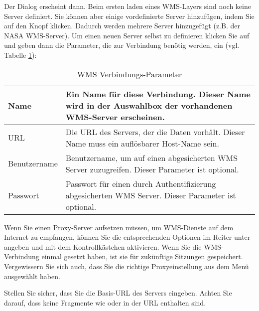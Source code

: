 Der Dialog  erscheint dann. Beim
ersten laden eines WMS-Layers sind noch keine Server definiert. Sie können
aber einige vordefinierte Server hinzufügen, indem Sie auf den Knopf
 klicken. Dadurch werden mehrere Server
hinzugefügt (z.B. der NASA WMS-Server). Um einen neuen Server selbst zu
definieren klicken Sie auf  und geben dann die Parameter, die zur
Verbindung benötig werden, ein (vgl. Tabelle \ref{tab:wms_connection_parms}):

\begin{table}[h]
\centering
\caption{WMS Verbindungs-Parameter}\label{tab:wms_connection_parms}\medskip
 \begin{tabular}{|l|p{11cm}|}
\hline Name & Ein Name für diese Verbindung. Dieser Name wird in der
Auswahlbox der vorhandenen WMS-Server erscheinen. \\
\hline URL \index{WMS!URL} & Die URL des Servers, der die Daten vorhält.
Dieser Name muss ein auflösbarer Host-Name sein.\\
\hline Benutzername \index{WMS!Authentifizierung} & Benutzername, um auf
einen abgesicherten WMS Server zuzugreifen. Dieser Parameter ist optional. \\
\hline Passwort & Passwort für einen durch Authentifizierung abgesicherten
WMS Server. Dieser Parameter ist optional. \\
\hline
\end{tabular}
\end{table}

Wenn Sie einen Proxy-Server aufsetzen müssen, um WMS-Dienste auf dem
Internet zu empfangen, können Sie die entsprechenden Optionen im Reiter
 unter  \arrow
{} angeben und mit dem
Kontrollkästchen  aktivieren. Wenn
Sie die WMS-Verbindung einmal gesetzt haben, ist sie für zukünftige Sitzungen
gespeichert. Vergewissern Sie sich auch, dass Sie die richtige
Proxyeinstellung aus dem  Menü ausgewählt haben.

\begin{Tip}[h]\caption{\textsc{WMS-Server-URLs}}
Stellen Sie sicher, dass Sie die Basis-URL des Servers eingeben.
Achten Sie darauf, dass keine Fragmente wie 
oder  in der URL enthalten sind.
\end{Tip}

